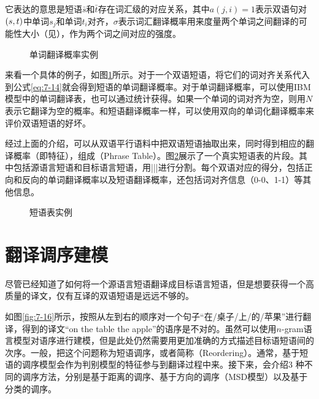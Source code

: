 \parinterval 它表达的意思是短语$\bar{s}$和$\bar{t}$存在词汇级的对应关系，其中$a(j,i)=1$表示双语句对$({s},{t})$中单词$s_j$和单词$t_i$对齐，$\sigma $表示词汇翻译概率用来度量两个单词之间翻译的可能性大小（见{\chapterfive}），作为两个词之间对应的强度。

\begin{figure}[htp]
\centering

\caption{单词翻译概率实例}
\label{fig:7-14}
\end{figure}

\parinterval 来看一个具体的例子，如图\ref{fig:7-14}所示。对于一个双语短语，将它们的词对齐关系代入到公式\eqref{eq:7-14}就会得到短语的单词翻译概率。对于单词翻译概率，可以使用IBM 模型中的单词翻译表，也可以通过统计获得。如果一个单词的词对齐为空，则用$N$表示它翻译为空的概率。和短语翻译概率一样，可以使用双向的单词化翻译概率来评价双语短语的好坏。

\parinterval 经过上面的介绍，可以从双语平行语料中把双语短语抽取出来，同时得到相应的翻译概率（即特征），组成{\small{}}（Phrase Table）。图\ref{fig:7-15}展示了一个真实短语表的片段。其中包括源语言短语和目标语言短语，用|||进行分割。每个双语对应的得分，包括正向和反向的单词翻译概率以及短语翻译概率，还包括词对齐信息（0-0、1-1）等其他信息。

\begin{figure}[htp]
\centering

\caption{短语表实例}
\label{fig:7-15}
\end{figure}

\sectionnewpage
\section{翻译调序建模}\label{subsection-7.4}

\parinterval 尽管已经知道了如何将一个源语言短语翻译成目标语言短语，但是想要获得一个高质量的译文，仅有互译的双语短语是远远不够的。

\parinterval 如图\ref{fig:7-16}所示，按照从左到右的顺序对一个句子“在/桌子/上/的/苹果”进行翻译，得到的译文“on the table the apple”的语序是不对的。虽然可以使用$n$-gram语言模型对语序进行建模，但是此处仍然需要用更加准确的方式描述目标语短语间的次序。一般，把这个问题称为短语调序，或者简称{\small{}}（Reordering）。通常，基于短语的调序模型会作为判别模型的特征参与到翻译过程中来。接下来，会介绍3 种不同的调序方法，分别是基于距离的调序、基于方向的调序（MSD模型）以及基于分类的调序。

